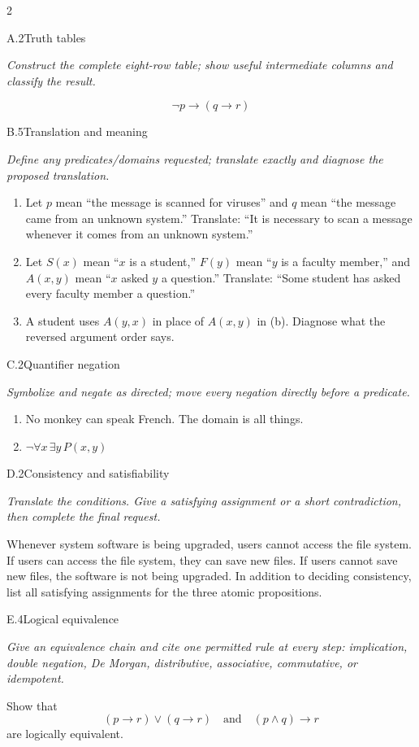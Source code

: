 \documentclass[9pt]{extarticle}
\begin{document}
\CoreWorkArea
\FormBreak
{}
\begin{multicols}{2}
\begin{CoreProblem}{A.2}{Truth tables}
{\scriptsize\textit{Construct the complete eight-row table; show useful intermediate columns and classify the result.}\par}
\[
  \neg p\to(q\to r)
\]
\end{CoreProblem}
\begin{CoreProblem}{B.5}{Translation and meaning}
{\scriptsize\textit{Define any predicates/domains requested; translate exactly and diagnose the proposed translation.}\par}
\begin{enumerate}[label=(\alph*)]
  \item Let $p$ mean ``the message is scanned for viruses'' and $q$ mean ``the
        message came from an unknown system.'' Translate: ``It is necessary to
        scan a message whenever it comes from an unknown system.''
  \item Let $S(x)$ mean ``$x$ is a student,'' $F(y)$ mean ``$y$ is a faculty
        member,'' and $A(x,y)$ mean ``$x$ asked $y$ a question.'' Translate:
        ``Some student has asked every faculty member a question.''
  \item A student uses $A(y,x)$ in place of $A(x,y)$ in (b). Diagnose what the
        reversed argument order says.
\end{enumerate}
\end{CoreProblem}
\begin{CoreProblem}{C.2}{Quantifier negation}
{\scriptsize\textit{Symbolize and negate as directed; move every negation directly before a predicate.}\par}
\begin{enumerate}[label=(\alph*)]
  \item No monkey can speak French. The domain is all things.
  \item $\neg\forall x\,\exists y\,P(x,y)$
\end{enumerate}
\end{CoreProblem}
\columnbreak
\begin{CoreProblem}{D.2}{Consistency and satisfiability}
{\scriptsize\textit{Translate the conditions. Give a satisfying assignment or a short contradiction, then complete the final request.}\par}
Whenever system software is being upgraded, users cannot access the file
system. If users can access the file system, they can save new files. If users
cannot save new files, the software is not being upgraded. In addition to
deciding consistency, list all satisfying assignments for the three atomic
propositions.
\end{CoreProblem}
\begin{CoreProblem}{E.4}{Logical equivalence}
{\scriptsize\textit{Give an equivalence chain and cite one permitted rule at every step: implication, double negation, De Morgan, distributive, associative, commutative, or idempotent.}\par}
Show that
\[
  (p\to r)\lor(q\to r)
  \quad\text{and}\quad
  (p\land q)\to r
\]
are logically equivalent.
\end{CoreProblem}
\end{multicols}
\end{document}

